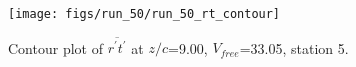 \begin{figure}[H]
\centering
\texttt{[image: figs/run\_50/run\_50\_rt\_contour]}
\caption{Contour plot of $\overline{r^\prime t^\prime}$ at $z/c$=9.00, $V_{free}$=33.05, station 5.}
\label{fig:run_50_rt_contour}
\end{figure}


